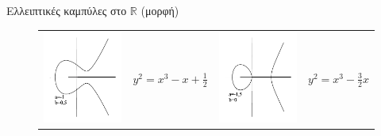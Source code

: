 \documentclass[handout]{beamer}
\begin{document}
\begin{frame}{Ελλειπτικές καμπύλες στο $\mathbb R$ (μορφή)}
\begin{figure}
\begin{tiny}
\begin{tabular}{cccc}
		\includegraphics[scale=0.25]{qaz3.png} & $y^2 = x^3 - x +\frac{1}{2} $ & \pause 
		\includegraphics[scale=0.25]{qaz4.png}  &  $y^2 = x^3 - \frac{3}{2}x $
\end{tabular}
\end{tiny}
\end{figure}
\end{frame}
\end{document}
